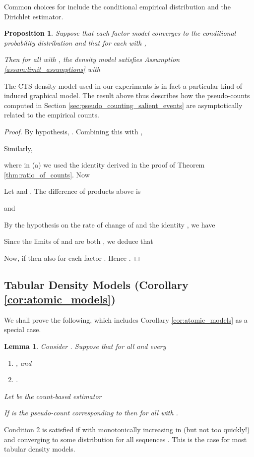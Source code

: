 \documentclass{article}
\newtheorem{lem}{Lemma}
\newtheorem{prop}{Proposition}
\begin{document}
{Common choices for  include the conditional empirical distribution and the Dirichlet estimator. 
\begin{prop}\label{prop:directed_graphical_models}
Suppose that each factor model  converges to the conditional probability distribution
 and that for each  with ,

Then for all  with , the density model  satisfies Assumption \ref{assum:limit_assumptions} with

\end{prop}
The CTS density model used in our experiments is in fact a particular kind of induced graphical model. The result above thus describes how the pseudo-counts computed in Section \ref{sec:pseudo_counting_salient_events} are asymptotically related to the empirical counts.

\begin{proof}
By hypothesis, . Combining this with , 

Similarly,

where in (a) we used the identity  derived in the proof
of Theorem \ref{thm:ratio_of_counts}. Now 

Let  and . The difference of products above is

and

By the hypothesis on the rate of change of  and the identity , we have 

Since the limits of  and  are both , we deduce that

Now, if  then also  for each factor . Hence .
\end{proof}

\subsection{Tabular Density Models (Corollary \ref{cor:atomic_models})}
We shall prove the following, which includes Corollary \ref{cor:atomic_models} as a special case. 

\begin{lem}\label{lem:atomic_models_extended}
Consider . Suppose that for all  and every 
\begin{enumerate}
    \item{, and}
    \item{.}
\end{enumerate}
Let  be the count-based estimator

If  is the pseudo-count corresponding to  then  for all  with . 
\end{lem}
Condition 2 is satisfied if  with  monotonically increasing in  (but not too quickly!) and  converging to some distribution  for all sequences . This is the case for most tabular density models. 

}
\end{document}
